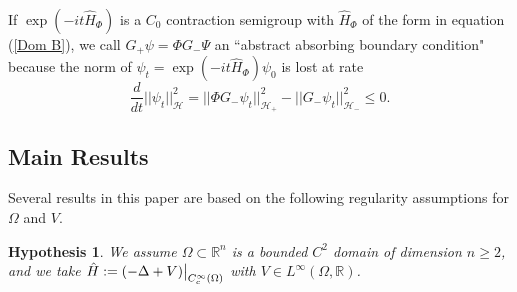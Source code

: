 \documentclass{article}
\numberwithin{equation}{section}
\newtheorem{hypothesis}{Hypothesis}
\begin{document}
If $\exp(-it\hat{H}_\Phi)$ is a $C_0$ contraction semigroup with $\hat{H}_\Phi$ of the form in equation (\ref{Dom B}), we call $G_+\psi=\Phi G_-\Psi$ an ``abstract absorbing boundary condition" because the norm of $\psi_t=\exp(-it\hat{H}_\Phi)\psi_0$ is lost at rate
    \begin{equation}
        \frac{d}{dt}||\psi_t||_{\mathcal{H}}^2=||\Phi G_-\psi_t||^2_{\mathcal{H}_+}- ||G_- \psi_t||^2_{\mathcal{H}_-}\leq 0.
    \end{equation}
\subsection{Main Results}
Several results in this paper are based on the following regularity assumptions for $\Omega$ and $V$.
\begin{hypothesis}\label{hypothesis}
    We assume $\Omega\subset \mathbb{R}^n$ is a bounded $C^2$ domain of dimension $n\geq 2$, and we take $\hat{H}:=(-\Delta+V)\big{|}_{C_c^\infty(\Omega)}$ with $V \in L^\infty(\Omega,\mathbb{R})$.
\end{hypothesis}
\end{document}
